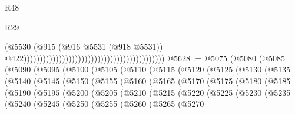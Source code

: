 \begin{lexlean}{R48}
\begin{lexlean}{R29}
\begin{coremodule}
{{{{{{{{{{{{{{{{{{{{{{{{{{{{{{{{{{{{{{{{{{{{{{{{{{{{{{{{{{{{{{{{{{{{{{{{{{{{{{{{{{{{{{{{{{{{{{{{{{{{{{{{{{{{{{{{{{{{{{{{{{{{{{{{{{{{{{{{{{{{{{{{{{{{{{{{{{{{{{{{{{{{{{{{{{{{{{{{{{{{{{{{{{{{{{{{{{{{{{{{{{{{{{{{{{{{{{{{{{                                                                                        (@5530
                                                                                          (@915
                                                                                            (@916
                                                                                              @5531
                                                                                              (@918
                                                                                                @5531))
                                                                                            @422))))))))))))))))))))))))))))))))))))))))))))
@5628 := @5075
    (@5080
      (@5085
        (@5090
          (@5095
            (@5100
              (@5105
                (@5110
                  (@5115
                    (@5120
                      (@5125
                        (@5130
                          (@5135
                            (@5140
                              (@5145
                                (@5150
                                  (@5155
                                    (@5160
                                      (@5165
                                        (@5170
                                          (@5175
                                            (@5180
                                              (@5185
                                                (@5190
                                                  (@5195
                                                    (@5200
                                                      (@5205
                                                        (@5210
                                                          (@5215
                                                            (@5220
                                                              (@5225
                                                                (@5230
                                                                  (@5235
                                                                    (@5240
                                                                      (@5245
                                                                        (@5250
                                                                          (@5255
                                                                            (@5260
                                                                              (@5265
                                                                                (@5270
}}}}}}}}}}}}}}}}}}}}}}}}}}}}}}}}}}}}}}}}}}}}}}}}}}}}}}}}}}}}}}}}}}}}}}}}}}}}}}}}}}}}}}}}}}}}}}}}}}}}}}}}}}}}}}}}}}}}}}}}}}}}}}}}}}}}}}}}}}}}}}}}}}}}}}}}}}}}}}}}}}}}}}}}}}}}}}}}}}}}}}}}}}}}}}}}}}}}}}}}}}}}}}}}}}}}}}}}}}
\end{coremodule}
\end{lexlean}
\end{lexlean}
